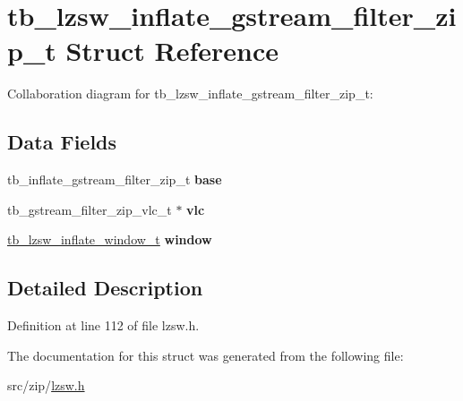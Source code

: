 \hypertarget{structtb__lzsw__inflate__gstream__filter__zip__t}{\section{tb\-\_\-lzsw\-\_\-inflate\-\_\-gstream\-\_\-filter\-\_\-zip\-\_\-t Struct Reference}
\label{structtb__lzsw__inflate__gstream__filter__zip__t}
}


Collaboration diagram for tb\-\_\-lzsw\-\_\-inflate\-\_\-gstream\-\_\-filter\-\_\-zip\-\_\-t\-:
\subsection*{Data Fields}
\begin{DoxyCompactItemize}
\item 
\hypertarget{structtb__lzsw__inflate__gstream__filter__zip__t_a97916c1593c66adab71677c47258c89e}{tb\-\_\-inflate\-\_\-gstream\-\_\-filter\-\_\-zip\-\_\-t {\bfseries base}}\label{structtb__lzsw__inflate__gstream__filter__zip__t_a97916c1593c66adab71677c47258c89e}

\item 
\hypertarget{structtb__lzsw__inflate__gstream__filter__zip__t_a72f4ea5cb564728cc121dd854b1d9b3e}{tb\-\_\-gstream\-\_\-filter\-\_\-zip\-\_\-vlc\-\_\-t $\ast$ {\bfseries vlc}}\label{structtb__lzsw__inflate__gstream__filter__zip__t_a72f4ea5cb564728cc121dd854b1d9b3e}

\item 
\hypertarget{structtb__lzsw__inflate__gstream__filter__zip__t_a9e6e656558219730afa4ed49761e9377}{\hyperlink{structtb__lzsw__inflate__window__t}{tb\-\_\-lzsw\-\_\-inflate\-\_\-window\-\_\-t} {\bfseries window}}\label{structtb__lzsw__inflate__gstream__filter__zip__t_a9e6e656558219730afa4ed49761e9377}

\end{DoxyCompactItemize}


\subsection{Detailed Description}


Definition at line 112 of file lzsw.\-h.



The documentation for this struct was generated from the following file\-:\begin{DoxyCompactItemize}
\item 
src/zip/\hyperlink{lzsw_8h}{lzsw.\-h}\end{DoxyCompactItemize}
